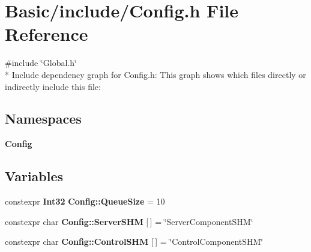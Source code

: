 \section{Basic/include/\-Config.h File Reference}
\label{Config_8h}
{\ttfamily \#include \char`\"{}Global.\-h\char`\"{}}\\*
Include dependency graph for Config.\-h\-:
This graph shows which files directly or indirectly include this file\-:
\subsection*{Namespaces}
\begin{DoxyCompactItemize}
\item 
{\bf Config}
\end{DoxyCompactItemize}
\subsection*{Variables}
\begin{DoxyCompactItemize}
\item 
constexpr {\bf Int32} {\bf Config\-::\-Queue\-Size} = 10
\item 
constexpr char {\bf Config\-::\-Server\-S\-H\-M} [$\,$] = \char`\"{}Server\-Component\-S\-H\-M\char`\"{}
\item 
constexpr char {\bf Config\-::\-Control\-S\-H\-M} [$\,$] = \char`\"{}Control\-Component\-S\-H\-M\char`\"{}
\end{DoxyCompactItemize}
